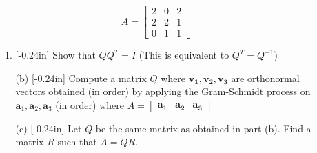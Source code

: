 \documentclass[letterpaper,12pt]{article}
\theoremstyle{definition}
\begin{document}
 $$A=\begin{bmatrix}
     2 & 0 & 2 \\ 2 & 2 & 1 \\ 0& 1 & 1
 \end{bmatrix}$$
    \begin{enumerate}
        \item[] \begin{enumerate}
            \item \reversemarginpar{}[-0.24in]  Show that $QQ^T = I$ (This is equivalent to $Q^T = Q^{-1}$)
        \end{enumerate}
    \end{enumerate}
\newpage
\begin{enumerate}
    \item[] \begin{enumerate}
        \item[(b)]\reversemarginpar{}[-0.24in] Compute a matrix $Q$ where $\mathbf{v_1},\mathbf{v_2},\mathbf{v_3}$ are orthonormal vectors obtained (in order) by applying the Gram-Schmidt process on $
        \mathbf{a}_1, \mathbf{a}_2, \mathbf{a}_3$ (in order) where $A = \begin{bmatrix}
            \mathbf{a_1} & \mathbf{a_2} & \mathbf{a_3}
        \end{bmatrix}$
    \end{enumerate}
\end{enumerate}
\newpage
\begin{enumerate}
    \item[] \begin{enumerate}
        \item[(c)]\reversemarginpar{}[-0.24in] Let $Q$ be the same matrix as obtained in part (b). Find a matrix $R$ such that $A = QR$.
    \end{enumerate}
\end{enumerate}
\end{document}
